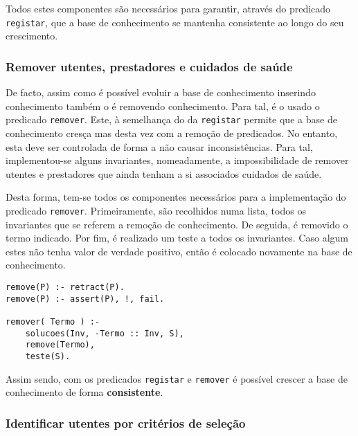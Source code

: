 \documentclass[a4paper]{article}
\begin{document}
\vspace{3mm}

Todos estes componentes são necessários para garantir, através do predicado \texttt{registar}, que a base de conhecimento se mantenha consistente ao longo do seu crescimento.


\subsubsection{Remover utentes, prestadores e cuidados de saúde}

\hspace{3mm} De facto, assim como é possível evoluir a base de conhecimento inserindo conhecimento também o é removendo conhecimento. Para tal, é o usado o predicado \texttt{remover}. Este, à semelhança do da \texttt{registar} permite que a base de conhecimento cresça mas desta vez com a remoção de predicados. No entanto, esta deve ser controlada de forma a não causar inconsistências. Para tal, implementou-se alguns invariantes, nomeadamente, a impossibilidade de remover utentes e prestadores que ainda tenham a si associados cuidados de saúde.

Desta forma, tem-se todos os componentes necessários para a implementação do predicado \texttt{remover}. Primeiramente, são recolhidos numa lista, todos os invariantes que se referem a remoção de conhecimento. De seguida, é removido o termo indicado. Por fim, é realizado um teste a todos os invariantes. Caso algum estes não tenha valor de verdade positivo, então é colocado novamente na base de conhecimento.

\vspace{3mm}

\begin{lstlisting}[xleftmargin=.2\textwidth]
remove(P) :- retract(P).
remove(P) :- assert(P), !, fail.

remover( Termo ) :- 
    solucoes(Inv, -Termo :: Inv, S),
    remove(Termo),
    teste(S).
\end{lstlisting}

\vspace{3mm}

Assim sendo, com os predicados \texttt{registar} e \texttt{remover} é possível crescer a base de conhecimento de forma \textbf{consistente}.

\subsubsection{Identificar utentes por critérios de seleção}
\end{document}
